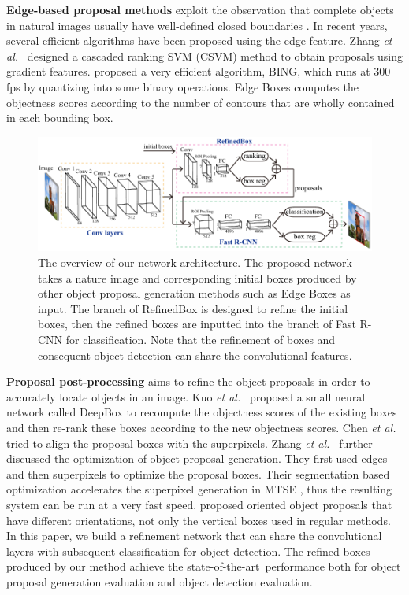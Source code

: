 \documentclass[letterpaper]{article} %
\newcommand{\myPara}[1]{\vspace{.1in}\textbf{#1}}
\def\etal{{\em et al.~}}
\def\sArt{{state-of-the-art~}}
\begin{document}
\myPara{Edge-based proposal methods} exploit the observation that complete objects
in natural images usually have well-defined closed boundaries \cite{alexe2012measuring}.
In recent years, several efficient algorithms have been proposed using the edge feature.
Zhang \etal \cite{zhang2016object} designed a cascaded ranking SVM (CSVM) method
to obtain proposals using gradient features.
\cite{cheng2014bing} proposed a very efficient algorithm, BING, which
runs at 300 fps by quantizing \cite{zhang2016object} into some binary operations.
Edge Boxes \cite{zitnick2014edge} computes the objectness scores according to
the number of contours that are wholly contained in each bounding box.


\begin{figure}[t]
	\centering
    \includegraphics[width=\linewidth]{network}
    \caption{The overview of our network architecture. The proposed network takes a
    	nature image and corresponding initial boxes produced by other object proposal
        generation methods such as Edge Boxes as input. The branch of RefinedBox is
        designed to refine the initial boxes, then the refined boxes are inputted into
        the branch of Fast R-CNN for classification. Note that the refinement of boxes
        and consequent object detection can share the convolutional features.}
    \label{fig:network}
\end{figure}


\myPara{Proposal post-processing} aims to refine the object proposals in
order to accurately locate objects in an image.
%
Kuo \etal \cite{kuo2015deepbox} proposed a small neural network called DeepBox
to recompute the objectness scores of the existing boxes and then re-rank these
boxes according to the new objectness scores.
%
Chen \etal \cite{chen2015improving} tried to align the proposal boxes with the
superpixels.
%
Zhang \etal \cite{zhang2017sequential} further discussed the optimization of
object proposal generation.
They first used edges and then superpixels to optimize the proposal boxes.
Their segmentation based optimization accelerates the superpixel generation in MTSE
\cite{chen2015improving}, thus the resulting system can be run at a very fast speed.
%
\cite{he2015oriented} proposed oriented object proposals that have different
orientations, not only the vertical boxes used in regular methods.
%
In this paper, we build a refinement network that can share the convolutional layers
with subsequent classification for object detection.
The refined boxes produced by our method achieve the \sArt performance both for
object proposal generation evaluation and object detection evaluation.
\end{document}
